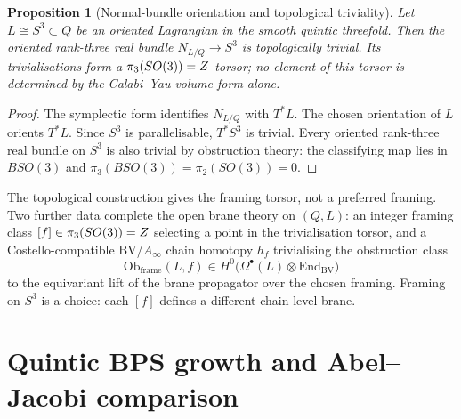 \documentclass[12pt]{amsart}
\newtheorem{prop}[thm]{Proposition}
\theoremstyle{remark}
\providecommand{\End}{\mathrm{End}}
\begin{document}
\begin{prop}[Normal-bundle orientation and topological triviality]
  \label{prop:s3-framing-quintic}
  Let \(L\cong S^3\subset Q\) be an oriented Lagrangian in the smooth
  quintic threefold.  Then the oriented rank-three real bundle
  \(N_{L/Q}\to S^3\) is topologically trivial.  Its trivialisations form
  a \(\pi_3(SO(3))=Z\)-torsor; no element of this torsor is determined
  by the Calabi--Yau volume form alone.
\end{prop}

\begin{proof}
  The symplectic form identifies \(N_{L/Q}\) with \(T^*L\).  The chosen
  orientation of \(L\) orients \(T^*L\).  Since \(S^3\) is
  parallelisable, \(T^*S^3\) is trivial.  Every oriented rank-three real
  bundle on \(S^3\) is also trivial by obstruction theory: the
  classifying map lies in \(BSO(3)\) and
  \(\pi_3(BSO(3))=\pi_2(SO(3))=0\).
\end{proof}

The topological construction gives the framing torsor, not a preferred
framing.  Two further data complete the open brane theory on
\((Q,L)\): an integer framing class \([f]\in\pi_3(SO(3))=Z\)
selecting a point in the trivialisation torsor, and a
Costello-compatible BV/\(A_\infty\) chain homotopy \(h_f\) trivialising
the obstruction class
\[
  \mathrm{Ob}_{\mathrm{frame}}(L,f)\in
  H^0\bigl(\Omega^\bullet(L)\otimes\End_{\mathrm{BV}}\bigr)
\]
to the equivariant lift of the brane propagator over the chosen
framing.  Framing on \(S^3\) is a choice: each \([f]\)
defines a different chain-level brane.

\section{Quintic BPS growth and Abel--Jacobi comparison}\label{sec:chiral-volume}
\end{document}
